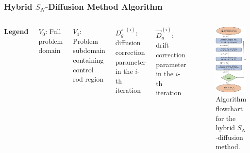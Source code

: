 \begin{frame}
  \frametitle{Hybrid $S_N$-Diffusion Method Algorithm}
  \begin{columns}
    \vspace{.5cm}

  {\small
    \textbf{Legend}
    \vspace{.1cm}

  $V_0$: Full problem domain
  \vspace{.1cm}

  $V_1$: Problem subdomain containing control rod region
  \vspace{.1cm}

  $D^{s,(i)}_g$: diffusion correction parameter in the $i$-th iteration
  \vspace{.1cm}

  $\vec{D}^{(i)}_g$: drift correction parameter in the $i$-th iteration
\vspace{4cm}}
  \begin{figure}
    \centering
    \includegraphics[width=.46\textwidth]{images/algorithm}
    \begin{minipage}[b]{.49\textwidth}
      \caption{Algorithm flowchart for the hybrid $S_N$-diffusion method.}
    \end{minipage}
  \end{figure}
\end{columns}
\end{frame}

